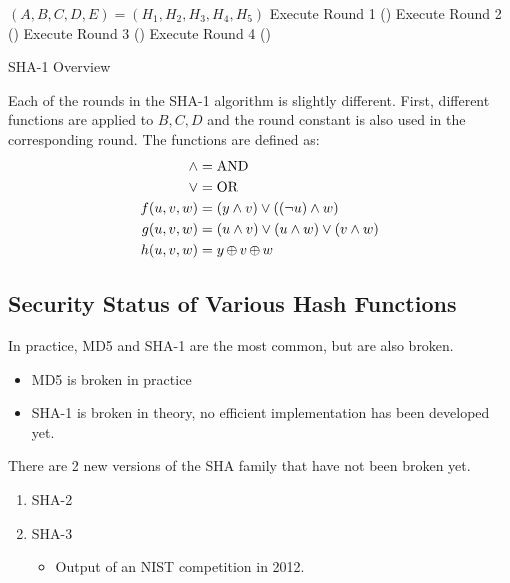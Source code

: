 \begin{algorithm}[H]
  \DontPrintSemicolon{}

  \BlankLine{}

  $(A, B, C, D, E) = (H_{1}, H_{2}, H_{3}, H_{4}, H_{5})$\;
  Execute Round 1 () \;
  Execute Round 2 () \;
  Execute Round 3 () \;
  Execute Round 4 () \;
  \caption{SHA-1 Overview}
  \label{algo:SHA_1_Overview}
\end{algorithm}

Each of the rounds in the SHA-1 algorithm is slightly different.
First, different functions are applied to $B, C, D$ and the round constant is also used in the corresponding round.
The functions are defined as:
\begin{align*}
  \wedge &= \text{AND} \\
  \vee &= \text{OR} \\
  f(u, v, w) &= (y \wedge v) \vee ((\neg u) \wedge w) \\
  g(u, v, w) &= (u \wedge v) \vee (u \wedge w) \vee (v \wedge w) \\
  h(u, v, w) &= y \operatorname{\oplus} v \operatorname{\oplus} w
\end{align*}


\subsection{Security Status of Various Hash Functions}\label{subsec:Hash_Functions_Security_Status}
In practice, MD5 and SHA-1 are the most common, but are also broken.
\begin{itemize}[noitemsep]
\item MD5 is broken in practice
\item SHA-1 is broken in theory, no efficient implementation has been developed yet.
\end{itemize}

There are 2 new versions of the SHA family that have not been broken yet.
\begin{enumerate}[noitemsep]
\item SHA-2
\item SHA-3
  \begin{itemize}[noitemsep]
  \item Output of an NIST competition in 2012.
  \end{itemize}
\end{enumerate}

